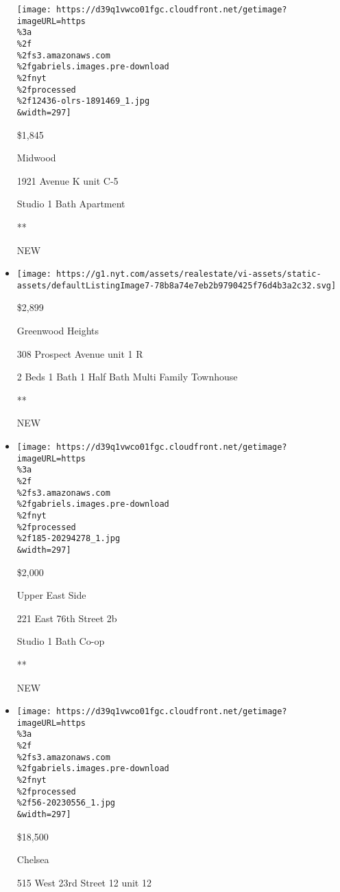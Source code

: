 \begin{itemize}
  \texttt{[image: https://d39q1vwco01fgc.cloudfront.net/getimage?imageURL=https\\\%3a\\\%2f\\\%2fs3.amazonaws.com\\\%2fgabriels.images.pre-download\\\%2fnyt\\\%2fprocessed\\\%2f12436-olrs-1891469\_1.jpg\\\&width=297]}

  \$1,845

  Midwood

  1921 Avenue K unit C-5

  Studio \textbar{} 1 Bath \textbar{} Apartment

  **

  NEW
\item
  \href{/real-estate/usa/ny/brooklyn/greenwood-heights/homes-for-rent/308-prospect-avenue/13278-PRCH-3015693?}{}

  \texttt{[image: https://g1.nyt.com/assets/realestate/vi-assets/static-assets/defaultListingImage7-78b8a74e7eb2b9790425f76d4b3a2c32.svg]}

  \$2,899

  Greenwood Heights

  308 Prospect Avenue unit 1 R

  2 Beds \textbar{} 1 Bath \textbar{} 1 Half Bath \textbar{} Multi
  Family Townhouse

  **

  NEW
\item
  \href{/real-estate/usa/ny/new-york/upper-east-side/homes-for-rent/221-east-76th-street-2b/185-20294278?}{}

  \texttt{[image: https://d39q1vwco01fgc.cloudfront.net/getimage?imageURL=https\\\%3a\\\%2f\\\%2fs3.amazonaws.com\\\%2fgabriels.images.pre-download\\\%2fnyt\\\%2fprocessed\\\%2f185-20294278\_1.jpg\\\&width=297]}

  \$2,000

  Upper East Side

  221 East 76th Street 2b

  Studio \textbar{} 1 Bath \textbar{} Co-op

  **

  NEW
\item
  \href{/real-estate/usa/ny/new-york/chelsea/homes-for-rent/515-west-23rd-street-12/56-20230556?}{}

  \texttt{[image: https://d39q1vwco01fgc.cloudfront.net/getimage?imageURL=https\\\%3a\\\%2f\\\%2fs3.amazonaws.com\\\%2fgabriels.images.pre-download\\\%2fnyt\\\%2fprocessed\\\%2f56-20230556\_1.jpg\\\&width=297]}

  \$18,500

  Chelsea

  515 West 23rd Street 12 unit 12


\end{itemize}

